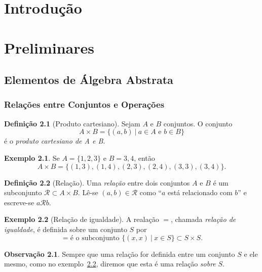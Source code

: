 \documentclass[a4paper,12pt]{report}
\theoremstyle{plain}
\theoremstyle{definition}
\newtheorem{definicao}{Definição}[section]
\newtheorem{observacao}{Observação}[section]
\newtheorem{exemplo}{Exemplo}[section]
\begin{document}
	\chapter{Introdução}
	
	\newpage
	
	\chapter{Preliminares}
	
	\section{Elementos de Álgebra Abstrata}
	
	\subsection{Relações entre Conjuntos e Operações}
	
	\begin{definicao}[Produto cartesiano]
		Sejam $A$ e $B$ conjuntos. O conjunto $$A\times B = \{(a,b) \ | \ a\in A \text{ e } b\in B\}$$
		é o \emph{produto cartesiano de A e B}.
	\end{definicao}
	
	\begin{exemplo}
		Se $A = \{1,2,3\}$ e $B = {3,4}$, então $$A\times B = \{(1,3),(1,4),(2,3),(2,4),(3,3),(3,4)\}.$$
	\end{exemplo}
	
	\begin{definicao}[Relação]
		Uma	\emph{relação} entre dois conjuntos $A$ e $B$ é um subconjunto $\mathcal{R}\subset A\times B$. Lê-se $(a,b) \in \mathcal{R}$ como ``$a$ está relacionado com $b$'' e escreve-se $a\mathcal{R}b$.
	\end{definicao}
	
	\begin{exemplo}[Relação de igualdade]\label{ex:igualdade}
		A realação $=$, chamada \emph{relação de igualdade}, é definida sobre um conjunto $S$ por $$= \text{é o subconjunto } \{(x,x) \ |\ x\in S\}\subset S\times S.$$
	\end{exemplo}
	
	\begin{observacao}
		Sempre que uma relação for definida entre um conjunto $S$ e ele mesmo, como no exemplo~\ref{ex:igualdade}, diremos que esta é uma relação \emph{sobre} $S$.
	\end{observacao}
	
\end{document}
